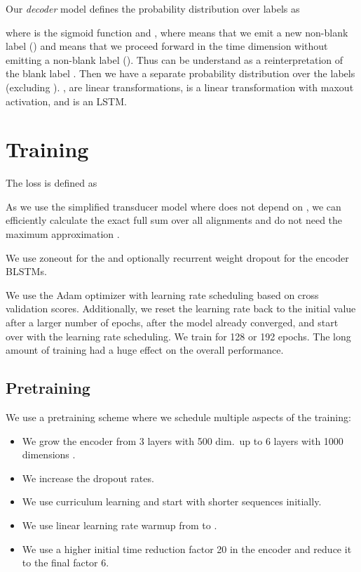 \documentclass[a4paper]{article}
\begin{document}
Our \emph{decoder} model defines the probability distribution
over labels  as

where  is the sigmoid function
and ,
where  means that we emit a new non-blank label ()
and  means that we proceed forward in the time dimension
without emitting a non-blank label ().
Thus  can be understand as a reinterpretation of the blank label .
Then we have a separate probability distribution 
over the labels  (excluding ).
, 
are linear transformations,
 is a linear transformation with maxout activation,
and  is an LSTM.


\section{Training}

The loss is defined as

As we use the simplified transducer model
where  does not depend on ,
we can efficiently calculate the exact full sum over all alignments 
and do not need the maximum approximation \cite{zeyer2020:transducer}.

We use zoneout \cite{krueger2017zoneout} for the 
and optionally recurrent weight dropout \cite{wan13dropconnect} for the encoder BLSTMs.

We use the Adam optimizer \cite{kingma2015adam}
with learning rate scheduling based on cross validation scores.
Additionally, we reset the learning rate back to the initial value after a larger number of epochs,
after the model already converged,
and start over with the learning rate scheduling.
We train for 128 or 192 epochs.
The long amount of training had a huge effect on the overall performance.

\subsection{Pretraining}

We use a pretraining scheme
where we schedule multiple aspects of the training:
\begin{itemize}
\item We grow the encoder from 3 layers with 500 dim.~up to 6 layers with 1000 dimensions \cite{zeyer2018:attanalysis}.
\item We increase the dropout rates.
\item
We use curriculum learning and start with shorter sequences initially.
\item We use linear learning rate warmup from  to .
\item We use a higher initial time reduction factor 20 in the encoder
and reduce it to the final factor 6.
\end{itemize}
\end{document}
